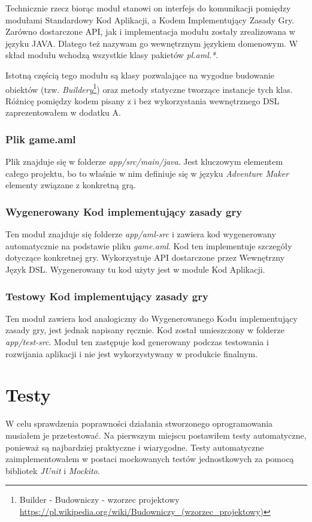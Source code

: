 \documentclass[openright]{xmgr}
\begin{document}
Technicznie rzecz biorąc moduł stanowi on interfejs do komunikacji pomiędzy modułami Standardowy Kod Aplikacji, a Kodem Implementujący Zasady Gry. Zarówno dostarczone API, jak i implementacja modułu zostały zrealizowana w języku JAVA. Dlatego też nazywam go wewnętrznym językiem domenowym. W skład modułu wchodzą wszystkie klasy pakietów \textit{pl.aml.*}.

Istotną częścią tego modułu są klasy pozwalające na wygodne budowanie obiektów (tzw. \textit{Buildery}\footnote{Builder - Budowniczy  - wzorzec projektowy  \url{https://pl.wikipedia.org/wiki/Budowniczy_(wzorzec_projektowy)}}) oraz metody statyczne tworzące instancje tych klas. Różnicę pomiędzy kodem pisany z i bez wykorzystania wewnętrznego DSL zaprezentowałem w dodatku A.

\subsection*{Plik game.aml}
Plik znajduje się w folderze \textit{app/src/main/java}. Jest kluczowym elementem całego projektu, bo to właśnie w nim definiuje się w języku \textit{Adventure Maker} elementy związane z konkretną grą.

\subsection*{Wygenerowany Kod implementujący zasady gry}
Ten moduł znajduje się folderze \textit{app/aml-src} i zawiera kod wygenerowany automatycznie na podstawie pliku \textit{game.aml}. Kod ten implementuje szczegóły dotyczące konkretnej gry. Wykorzystuje API dostarczone przez Wewnętrzny Język DSL. Wygenerowany tu kod użyty jest w module Kod Aplikacji.

\subsection*{Testowy Kod implementujący zasady gry}
Ten moduł zawiera kod analogiczny do Wygenerowanego Kodu implementujący zasady gry, jest jednak napisany ręcznie. Kod został umieszczony w folderze \textit{app/test-src}. Moduł ten zastępuje kod generowany podczas testowania i rozwijania aplikacji i nie jest wykorzystywany w produkcie finalnym.

\chapter{Testy} 

W celu sprawdzenia poprawności działania stworzonego oprogramowania musiałem je przetestować. Na pierwszym miejscu postawiłem testy automatyczne, ponieważ są najbardziej praktyczne i wiarygodne. Testy automatyczne zaimplementowałem w postaci mockowanych testów jednostkowych za pomocą bibliotek \textit{JUnit} i \textit{Mockito}.
\end{document}
